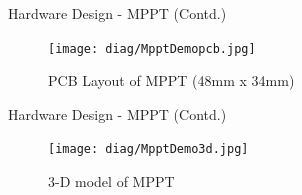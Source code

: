 \documentclass[aspectratio=169]{beamer}
\begin{document}
		
		
		\begin{frame}{Hardware Design - MPPT (Contd.) }
			\begin{figure}[h]
				\centering
				\texttt{[image: diag/MpptDemopcb.jpg]}
				\caption{PCB Layout of MPPT (48mm x 34mm)}
				\label{fig:mesh1}
			\end{figure}
		\end{frame}
		\begin{frame}{Hardware Design - MPPT (Contd.)}
			\begin{figure}[h]
				\centering
				\texttt{[image: diag/MpptDemo3d.jpg]}
				\caption{3-D model of MPPT}
				\label{fig:mesh1}
			\end{figure}
		\end{frame}
\end{document}
